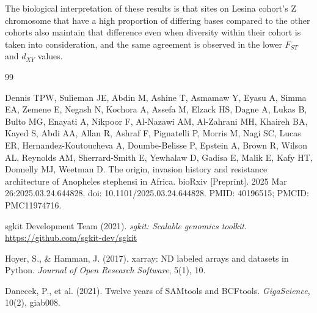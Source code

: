 \documentclass{article}
\begin{document}
The biological interpretation of these results is that sites on Lesina cohort's Z chromosome that have a high proportion of differing bases compared to the other cohorts also maintain that difference even when diversity within their cohort is taken into consideration, and the same agreement is observed in the lower $F_{ST}$ and $d_{XY}$ values.

\begin{thebibliography}{99}

Dennis TPW, Sulieman JE, Abdin M, Ashine T, Asmamaw Y, Eyasu A, Simma EA, Zemene E, Negash N, Kochora A, Assefa M, Elzack HS, Dagne A, Lukas B, Bulto MG, Enayati A, Nikpoor F, Al-Nazawi AM, Al-Zahrani MH, Khaireh BA, Kayed S, Abdi AA, Allan R, Ashraf F, Pignatelli P, Morris M, Nagi SC, Lucas ER, Hernandez-Koutoucheva A, Doumbe-Belisse P, Epstein A, Brown R, Wilson AL, Reynolds AM, Sherrard-Smith E, Yewhalaw D, Gadisa E, Malik E, Kafy HT, Donnelly MJ, Weetman D. The origin, invasion history and resistance architecture of Anopheles stephensi in Africa. bioRxiv [Preprint]. 2025 Mar 26:2025.03.24.644828. doi: 10.1101/2025.03.24.644828. PMID: 40196515; PMCID: PMC11974716.

sgkit Development Team (2021).
\textit{sgkit: Scalable genomics toolkit}.
\url{https://github.com/sgkit-dev/sgkit}

Hoyer, S., \& Hamman, J. (2017).
xarray: ND labeled arrays and datasets in Python.
\textit{Journal of Open Research Software}, 5(1), 10.

Danecek, P., et al. (2021).
Twelve years of SAMtools and BCFtools.
\textit{GigaScience}, 10(2), giab008.

\end{thebibliography}
\end{document}
